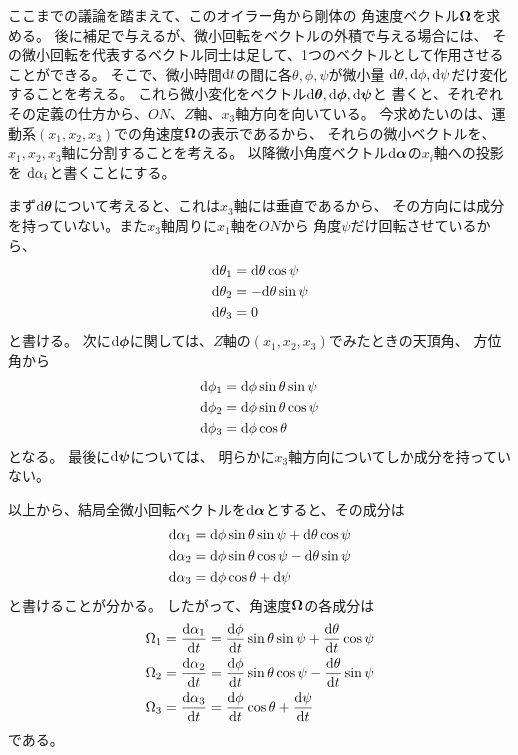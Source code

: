 \documentclass[a4paper]{jsarticle}
\def\vec#1{\mbox{\boldmath $#1$}}
\newcommand{\dif}[2]{\frac{{\rm d} #1}{{\rm d} #2}}
\newcommand{\ddif}{{\rm d}}
\begin{document}
ここまでの議論を踏まえて、このオイラー角から剛体の
角速度ベクトル$\vec{\Omega}$を求める。
後に補足で与えるが、微小回転をベクトルの外積で与える場合には、
その微小回転を代表するベクトル同士は足して、1つのベクトルとして作用させることができる。
そこで、微小時間$\ddif t$の間に各$\theta, \phi, \psi$が微小量
$\ddif \theta, \ddif \phi, \ddif \psi$だけ変化することを考える。
これら微小変化をベクトル$\ddif \vec{\theta}, \ddif \vec{\phi}, \ddif \vec{\psi}$と
書くと、それぞれその定義の仕方から、$ON$、$Z$軸、$x_3$軸方向を向いている。
今求めたいのは、運動系$(x_1, x_2, x_3)$での角速度$\vec{\Omega}$の表示であるから、
それらの微小ベクトルを、$x_1, x_2, x_3$軸に分割することを考える。
以降微小角度ベクトル$\ddif \vec{\alpha}$の$x_i$軸への投影を
$\ddif \alpha_i$と書くことにする。

まず$\ddif \vec{\theta}$について考えると、これは$x_3$軸には垂直であるから、
その方向には成分を持っていない。また$x_3$軸周りに$x_1$軸を$ON$から
角度$\psi$だけ回転させているから、
\begin{align}
	&\ddif \theta_1 = \ddif \theta \cos \psi \\
	&\ddif \theta_2 = -\ddif \theta \sin \psi \\
	&\ddif \theta_3 = 0
\end{align}
と書ける。
次に$\ddif \vec{\phi}$に関しては、$Z$軸の$(x_1, x_2, x_3)$でみたときの天頂角、
方位角から
\begin{align}
	&\ddif \phi_1 = \ddif \phi \sin \theta \sin \psi \\
	&\ddif \phi_2 = \ddif \phi \sin \theta \cos \psi \\
	&\ddif \phi_3 = \ddif \phi \cos \theta
\end{align}
となる。
最後に$\ddif \vec{\psi}$については、
明らかに$x_3$軸方向についてしか成分を持っていない。

以上から、結局全微小回転ベクトルを$\ddif \vec{\alpha}$とすると、その成分は
\begin{align}
	&\ddif \alpha_1 = \ddif \phi \sin \theta \sin \psi
	+ \ddif \theta \cos \psi \\
	&\ddif \alpha_2 = \ddif \phi \sin \theta \cos \psi
	- \ddif \theta \sin \psi  \\
	&\ddif \alpha_3 = \ddif \phi \cos \theta + \ddif \psi
\end{align}
と書けることが分かる。
したがって、角速度$\vec{\Omega}$の各成分は
\begin{align}
	&\Omega_1 = \dif{\alpha_1}{t} = \dif{\phi}{t} \sin \theta \sin \psi
	+ \dif{\theta}{t} \cos \psi \\
	&\Omega_2 = \dif{\alpha_2}{t} = \dif{\phi}{t} \sin \theta \cos \psi
	- \dif{\theta}{t} \sin \psi \\
	&\Omega_3 = \dif{\alpha_3}{t} = \dif{\phi}{t} \cos \theta + \dif{\psi}{t}
\end{align}
である。
\end{document}
